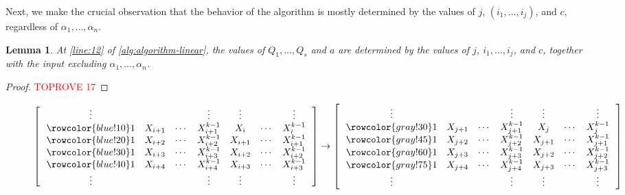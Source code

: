 \documentclass[11pt]{article}
\theoremstyle{plain}
\newtheorem{lemma}[thm]{Lemma}
\theoremstyle{definition}
\theoremstyle{remark}
\begin{document}
Next, we make the crucial observation that the behavior of the algorithm is mostly determined by the values of $j$, $(i_1,\dots,i_j)$, and $c$, regardless of $\alpha_1,\dots,\alpha_n$. 

\begin{lemma}\label{lem:determined}
At \cref{line:12} of \cref{alg:algorithm-linear}, the values of $Q_1,\dots,Q_s$ and $a$ are determined by the values of $j$, $i_1,\dots,i_j$, and $c$, together with the input excluding $\alpha_1,\dots,\alpha_n$. 
\end{lemma}

\begin{proof}\textcolor{red}{TOPROVE 17}\end{proof}



\begin{figure}
    \centering
    
        \begin{align*}
       \left[\,\,\,\,
        \begin{matrix}
            \vdots &&&\vdots&\vdots &&\vdots\\
            \rowcolor{blue!10} 1 & X_{i+1} & \cdots & X_{i+1}^{k-1} & X_{i} & \cdots & X_{i}^{k-1} \\
            \rowcolor{blue!20} 1 & X_{i+2} & \cdots & X_{i+2}^{k-1} & X_{i+1} & \cdots & X_{i+1}^{k-1} \\
            \rowcolor{blue!30} 1 & X_{i+3} & \cdots & X_{i+3}^{k-1} & X_{i+2} & \cdots & X_{i+2}^{k-1} \\
            \rowcolor{blue!40} 1 & X_{i+4} & \cdots & X_{i+4}^{k-1} & X_{i+3} & \cdots & X_{i+3}^{k-1} \\
            \vdots &&&\vdots&\vdots &&\vdots\\
        \end{matrix}
        \,\,\,\,
        \right]
        \rightarrow
        \left[\,\,\,\,
        \begin{matrix}
            \vdots &&&\vdots&\vdots &&\vdots\\
            \rowcolor{gray!30} 1 & X_{j+1} & \cdots & X_{j+1}^{k-1} & X_{j} & \cdots & X_{j}^{k-1} \\
            \rowcolor{gray!45} 1 & X_{j+2} & \cdots & X_{j+2}^{k-1} & X_{j+1} & \cdots & X_{j+1}^{k-1} \\
            \rowcolor{gray!60} 1 & X_{j+3} & \cdots & X_{j+3}^{k-1} & X_{j+2} & \cdots & X_{j+2}^{k-1} \\
            \rowcolor{gray!75} 1 & X_{j+4} & \cdots & X_{j+4}^{k-1} & X_{j+3} & \cdots & X_{j+3}^{k-1} \\
            \vdots &&&\vdots&\vdots &&\vdots\\
        \end{matrix}
        \,\,\,\,
        \right]
    \end{align*} 


\end{figure}
\end{document}
